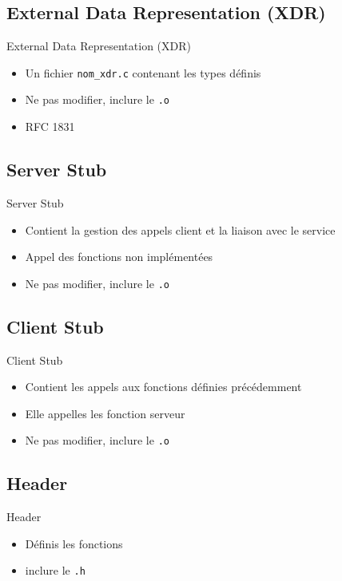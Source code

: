\begin{frame}[containsverbatim]{\sectitle}
    \def\subsectitle{External Data Representation (XDR)}
    \subsection{\subsectitle}
    \begin{block}{\subsectitle}
        \begin{itemize}
            \item Un fichier \verb+nom_xdr.c+ contenant les types définis
            \item Ne pas modifier, inclure le \verb+.o+
            \item RFC 1831
        \end{itemize}
    \end{block}
    \def\subsectitle{Server Stub}
    \subsection{\subsectitle}
    \begin{block}{\subsectitle}
        \begin{itemize}
            \item Contient la gestion des appels client et la liaison avec le
                service
            \item Appel des fonctions non implémentées
            \item Ne pas modifier, inclure le \verb+.o+
        \end{itemize}
    \end{block}
    \def\subsectitle{Client Stub}
    \subsection{\subsectitle}
    \begin{block}{\subsectitle}
        \begin{itemize}
            \item Contient les appels aux fonctions définies précédemment
            \item Elle appelles les fonction serveur
            \item Ne pas modifier, inclure le \verb+.o+
        \end{itemize}
    \end{block}
    \def\subsectitle{Header}
    \subsection{\subsectitle}
    \begin{block}{\subsectitle}
        \begin{itemize}
            \item Définis les fonctions
            \item inclure le \verb+.h+
        \end{itemize}
    \end{block}
\end{frame}


